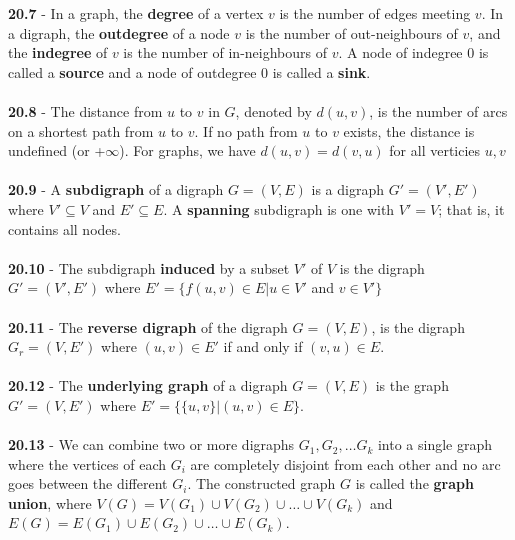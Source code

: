 \documentclass[a4paper]{article}
\begin{document}
\textbf{20.7} - In a graph, the \textbf{degree} of a vertex $v$ is the number of edges meeting
$v$. In a digraph, the \textbf{outdegree} of a node $v$ is the number of out-neighbours of
$v$, and the \textbf{indegree} of $v$ is the number of in-neighbours of $v$.
A node of indegree 0 is called a \textbf{source} and a node of outdegree 0 is called a \textbf{sink}.\\\\
\textbf{20.8} - The distance from $u$ to $v$ in $G$, denoted by $d(u, v)$, is the number
of arcs on a shortest path from $u$ to $v$. If no path from $u$ to $v$ exists, the distance is
undefined (or +$\infty$).
For graphs, we have $d(u, v)=d(v, u)$ for all verticies $u, v$\\\\
\textbf{20.9} - A \textbf{subdigraph} of a digraph $G = (V, E)$ is a digraph $G' = (V', E')$
where $V' \subseteq V$ and $E' \subseteq E$. A \textbf{spanning} subdigraph is one with $V' = V$; that is, it
contains all nodes.\\\\
\textbf{20.10} - The subdigraph \textbf{induced} by a subset $V'$ of $V$ is the digraph $G' =(V', E')$ 
where $E' = \{f(u, v) \in E | u \in V'$ and $v \in V'\}$\\\\
\textbf{20.11} - The \textbf{reverse digraph} of the digraph $G = (V, E)$, is the digraph
$G_r = (V, E')$ where $(u, v) \in E'$ if and only if $(v, u) \in E$.\\\\
\textbf{20.12} - The \textbf{underlying graph} of a digraph $G = (V, E)$ is the graph $G' =(V, E')$
where $E' = \{\{u, v\} | (u, v) \in E\}$.\\\\
\textbf{20.13} - We can combine two or more digraphs $G_1,G_2,\dots G_k$ into a single
graph where the vertices of each $G_i$ are completely disjoint from each other
and no arc goes between the different $G_i$. The constructed graph $G$ is called the
\textbf{graph union}, where $V(G) = V(G_1)\cup V(G_2) \cup \dots \cup V(G_k)$ and 
$E(G) = E(G_1)\cup E(G_2) \cup \dots \cup E(G_k)$.
\end{document}
